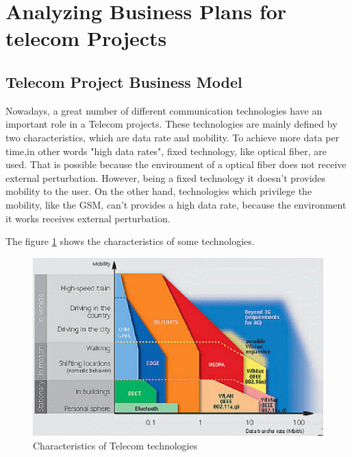 \documentclass[a4paper,11pt]{article}
\begin{document}
\titleTMB 
\newpage
\tableofcontents
\newpage

\pagestyle{fancy}

\section{Analyzing Business Plans for telecom Projects}
\subsection{Telecom Project Business Model}

Nowadays, a great  number of different communication technologies have an important role in a Telecom projects. These technologies are mainly defined by two characteristics, which are data rate and mobility.
To achieve more data per time,in other words "high data rates", fixed technology, like optical  fiber, are used. That is possible because the environment of a optical fiber does not receive external perturbation. However, being a fixed technology it doesn't provides mobility to the user.
On the other hand, technologies which  privilege the mobility, like the GSM,  can't provides  a high data rate, because the environment it works receives external perturbation.

The figure \ref{fig:tel_tech} shows the characteristics of some technologies.

\begin{figure}[h!]
\begin{centering}
\includegraphics[scale=0.8]{szenbild_1224832}
\par\end{centering}
\caption{Characteristics of Telecom technologies \protect\footnotemark}
\label{fig:tel_tech}
\end{figure}
\end{document}
